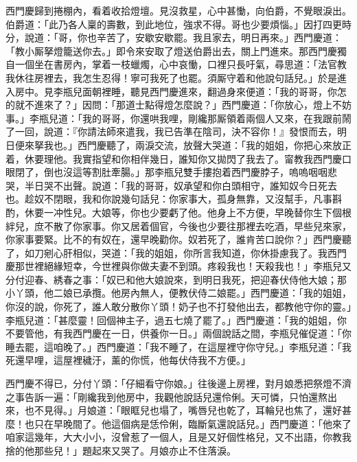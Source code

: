 西門慶歸到捲棚內，看着收拾燈壇。見沒救星，心中甚慟，向伯爵，不覺眼淚出。伯爵道：「此乃各人稟的壽數，到此地位，強求不得。哥也少要煩惱。」因打四更時分，說道：「哥，你也辛苦了，安歇安歇罷。我且家去，明日再來。」西門慶道：「教小厮拏燈籠送你去。」即令來安取了燈送伯爵出去，關上門進來。那西門慶獨自一個坐在書房內，掌着一枝蠟燭，心中哀慟，口裡只長吁氣，尋思道：「法官教我休往房裡去，我怎生忍得！寧可我死了也罷。須厮守着和他說句話兒。」{}於是進入房中。見李瓶兒面朝裡睡，聽見西門慶進來，翻過身來便道：「我的哥哥，你怎的就不進來了？」{}因問：「那道士點得燈怎麼說？」西門慶道：「你放心，燈上不妨事。」李瓶兒道：「我的哥哥，你還哄我哩，剛纔那厮領着兩個人又來，在我跟前鬧了一回，說道：『你請法師來遣我，我已告準在陰司，決不容你！』發恨而去，明日便來拏我也。」西門慶聽了，兩淚交流，{}放聲大哭道：「我的姐姐，你把心來放正着，休要理他。我實指望和你相伴幾日，誰知你又拋閃了我去了。甯教我西門慶口眼閉了，倒也沒這等割肚牽腸。」那李瓶兒雙手摟抱着西門慶脖子，嗚嗚咽咽悲哭，半日哭不出聲。說道：「我的哥哥，奴承望和你白頭相守，誰知奴今日死去也。趁奴不閉眼，我和你說幾句話兒：你家事大，孤身無靠，又沒幫手，凡事斟酌，休要一冲性兒。大娘等，你也少要虧了他。{}他身上不方便，早晚替你生下個根絆兒，庶不散了你家事。你又居着個官，今後也少要往那裡去吃酒，早些兒來家，你家事要緊。比不的有奴在，還早晚勸你。奴若死了，誰肯苦口說你？」{}西門慶聽了，如刀剜心肝相似，哭道：「我的姐姐，你所言我知道，你休掛慮我了。我西門慶那世裡絕緣短幸，今世裡與你做夫妻不到頭。疼殺我也！天殺我也！」李瓶兒又分付迎春、綉春之事：「奴已和他大娘說來，到明日我死，把迎春伏侍他大娘；那小丫頭，他二娘已承攬。他房內無人，便教伏侍二娘罷。」西門慶道：「我的姐姐，你沒的說，你死了，誰人敢分散你丫頭！奶子也不打發他出去，都教他守你的靈。」李瓶兒道：「甚麼靈！回個神主子，過五七燒了罷了。」西門慶道：「我的姐姐，你不要管他，有我西門慶在一日，供養你一日。」兩個說話之間，李瓶兒催促道：「你睡去罷，這咱晚了。」西門慶道：「我不睡了，在這屋裡守你守兒。」李瓶兒道：「我死還早哩，這屋裡穢汙，薰的你慌，他每伏侍我不方便。」

西門慶不得已，分付丫頭：「仔細看守你娘。」往後邊上房裡，對月娘悉把祭燈不濟之事告訴一遍：「剛纔我到他房中，我觀他說話兒還伶俐。天可憐，只怕還熬出來，也不見得。」{}月娘道：「眼眶兒也塌了，嘴唇兒也乾了，耳輪兒也焦了，還好甚麼！也只在早晚間了。他這個病是恁伶俐，臨斷氣還說話兒。」西門慶道：「他來了咱家這幾年，大大小小，沒曾惹了一個人，且是又好個性格兒，{}{}又不出語，你教我捨的他那些兒！」題起來又哭了。月娘亦止不住落淚。

